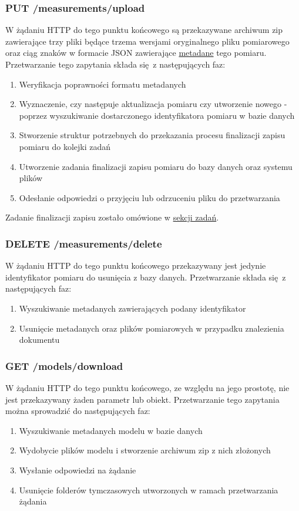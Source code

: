 	\subsubsection{PUT /measurements/upload}
	W żądaniu HTTP do tego punktu końcowego są przekazywane archiwum zip zawierające trzy pliki będące trzema wersjami oryginalnego pliku pomiarowego oraz ciąg znaków w formacie JSON zawierające \hyperref[metadata]{metadane} tego pomiaru. Przetwarzanie tego zapytania składa się z następujących faz:
	
	\begin{enumerate}
		\item {Weryfikacja poprawności formatu metadanych}
		\item {Wyznaczenie, czy następuje aktualizacja pomiaru czy utworzenie nowego -  poprzez wyszukiwanie dostarczonego identyfikatora pomiaru w bazie danych}
		\item {Stworzenie struktur potrzebnych do przekazania procesu finalizacji zapisu pomiaru do kolejki zadań}
		\item {Utworzenie zadania finalizacji zapisu pomiaru do bazy danych oraz systemu plików}
		\item {Odesłanie odpowiedzi o przyjęciu lub odrzuceniu pliku do przetwarzania}
	\end{enumerate}
	
	Zadanie finalizacji zapisu zostało omówione w \hyperref[tasks]{sekcji zadań}.
	
	\subsubsection{DELETE /measurements/delete}
	W żądaniu HTTP do tego punktu końcowego przekazywany jest jedynie identyfikator pomiaru do usunięcia z bazy danych. Przetwarzanie składa się z następujących faz:
	\begin{enumerate}
		\item {Wyszukiwanie metadanych zawierających podany identyfikator}
		\item {Usunięcie metadanych oraz plików pomiarowych w przypadku znalezienia dokumentu}
	\end{enumerate}
	
	\subsubsection{GET /models/download}
	W żądaniu HTTP do tego punktu końcowego, ze względu na jego prostotę, nie jest przekazywany żaden parametr lub obiekt. Przetwarzanie tego zapytania można sprowadzić do następujących faz:
	\begin{enumerate}
		\item {Wyszukiwanie metadanych modelu w bazie danych}
		\item {Wydobycie plików modelu i stworzenie archiwum zip z nich złożonych}
		\item {Wysłanie odpowiedzi na żądanie}
		\item {Usunięcie folderów tymczasowych utworzonych w ramach przetwarzania żądania}
	\end{enumerate}
	
